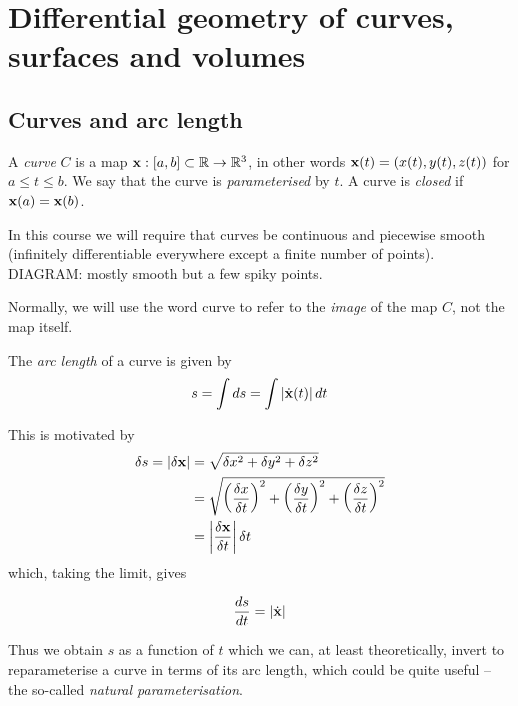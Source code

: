 \documentclass{../../template/note}
\begin{document}
    \section{Differential geometry of curves, surfaces and volumes}

    \subsection{Curves and arc length}

    \begin{definition*}
        A \emph{curve} \(C\) is a map \(\V x: [a, b] \subset \RR \to \RR^3\), in other words \(\V x(t) = (x(t), y(t), z(t))\) for \(a \leq t \leq b\). We say that the curve is \emph{parameterised} by \(t\). A curve is \emph{closed} if \(\V x(a) = \V x(b)\).
    \end{definition*}
    
    In this course we will require that curves be continuous and piecewise smooth (infinitely differentiable everywhere except a finite number of points). DIAGRAM: mostly smooth but a few spiky points.

    Normally, we will use the word curve to refer to the \emph{image} of the map \(C\), not the map itself.

    \begin{definition*}
        The \emph{arc length} of a curve is given by
        \begin{align*}
            s = \int ds = \int |\dot{\V x}(t)| \D t
        \end{align*}        
    \end{definition*}
    This is motivated by
    \begin{align*}
        \delta s = |\delta \V x| &= \sqrt{\delta x^2 + \delta y^2 + \delta z^2} \\
        &= \sqrt{\left(\frac{\delta x}{\delta t}\right)^2+\left(\frac{\delta y}{\delta t}\right)^2+\left(\frac{\delta z}{\delta t}\right)^2} \\
        &= \left|\frac{\delta \V x}{\delta t}\right|\delta t
    \end{align*}
    which, taking the limit, gives
    \begin{proposition}
        \label{4.1 }\[
            \frac{ds}{dt} = |\dot{\V x}|
        \]
    \end{proposition}
    
    Thus we obtain \(s\) as a function of \(t\) which we can, at least theoretically, invert to reparameterise a curve in terms of its arc length, which could be quite useful -- the so-called \emph{natural parameterisation}.
    
\end{document}
